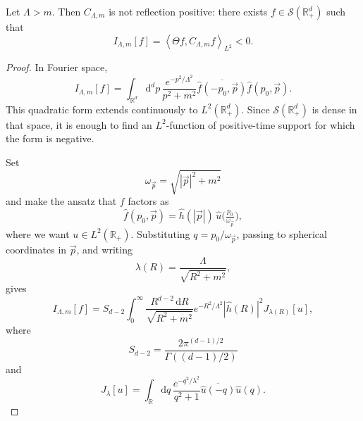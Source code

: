 \documentclass[10pt,a4paper]{amsart}
\begin{document}
\begin{theorem}
  Let \(\Lambda>m\). Then \(C_{\Lambda,m}\) is not reflection positive: there
  exists \(f\in\mathcal S(\mathbb R_+^d)\) such that
  \begin{equation}
    I_{\Lambda,m}[f]
    =
    \left\langle\Theta f,C_{\Lambda,m}f\right\rangle_{L^2}
    <0.
  \end{equation}
\end{theorem}

\begin{proof}
  In Fourier space,
  \begin{equation}
    I_{\Lambda,m}[f]
    =
    \int_{\mathbb R^d}\mathrm d^d p\,
    \frac{e^{-p^2/\Lambda^2}}{p^2+m^2}
    \overline{\hat f(-p_0,\vec p)}
    \hat f(p_0,\vec p).
  \end{equation}
  This quadratic form extends continuously to \(L^2(\mathbb R_+^d)\). Since
  \(\mathcal S(\mathbb R_+^d)\) is dense in that space, it is enough to find an
  \(L^2\)-function of positive-time support for which the form is negative.

  Set
  \begin{equation}
    \omega_{\vec p}=\sqrt{|\vec p|^2+m^2}
  \end{equation}
  and make the ansatz that $f$ factors as
  \begin{equation}
    \hat f(p_0,\vec p)
    =
    \hat h(|\vec p|)\,
    \hat u\!\big(\tfrac{p_0}{\omega_{\vec p}}\big),
  \end{equation}
  where we want \(u\in L^2(\mathbb R_+)\). Substituting
  \(q=p_0/\omega_{\vec p}\), passing to spherical coordinates in
  \(\vec p\), and writing
  \begin{equation}
    \lambda(R)=\frac{\Lambda}{\sqrt{R^2+m^2}},
  \end{equation}
  gives
  \begin{equation}
    I_{\Lambda,m}[f]
    =
    S_{d-2}\int_0^\infty
    \frac{R^{d-2}\,\mathrm dR}{\sqrt{R^2+m^2}}
    e^{-R^2/\Lambda^2}|\hat h(R)|^2
    J_{\lambda(R)}[u],
  \end{equation}
  where
  \begin{equation}
    S_{d-2}
    =
    \frac{2\pi^{(d-1)/2}}{\Gamma((d-1)/2)}
  \end{equation}
  and
  \begin{equation}
    J_\lambda[u]
    =
    \int_{\mathbb R}\mathrm dq\,
    \frac{e^{-q^2/\lambda^2}}{q^2+1}
    \overline{\hat u(-q)}\hat u(q).
  \end{equation}


\end{proof}
\end{document}
